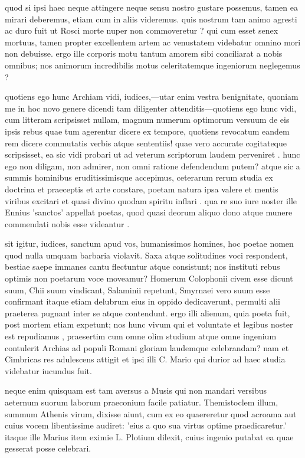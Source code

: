  quod si ipsi haec neque attingere neque sensu nostro gustare possemus, tamen ea mirari deberemus, etiam cum in aliis videremus. quis nostrum tam animo agresti ac duro fuit ut Rosci morte nuper non commoveretur ? qui cum esset senex mortuus, tamen propter excellentem artem ac venustatem videbatur omnino mori non debuisse. ergo ille corporis motu tantum amorem sibi conciliarat a nobis omnibus; nos animorum incredibilis motus celeritatemque ingeniorum neglegemus ?

 quotiens ego hunc Archiam vidi, iudices,—utar enim vestra benignitate, quoniam me in hoc novo genere dicendi tam diligenter attenditis—quotiens ego hunc vidi, cum litteram scripsisset nullam, magnum numerum optimorum versuum de eis ipsis rebus quae tum agerentur dicere ex tempore, quotiens revocatum eandem rem dicere commutatis verbis atque sententiis! quae vero accurate cogitateque scripsisset, ea sic vidi probari ut ad veterum scriptorum laudem perveniret . hunc ego non diligam, non admirer, non omni ratione defendendum putem? atque sic a summis hominibus eruditissimisque accepimus, ceterarum rerum studia ex doctrina et praeceptis et arte constare, poetam natura ipsa valere et mentis viribus excitari et quasi divino quodam spiritu inflari . qua re suo iure noster ille Ennius 'sanctos' appellat poetas, quod quasi deorum aliquo dono atque munere commendati nobis esse videantur .

 sit igitur, iudices, sanctum apud vos, humanissimos homines, hoc poetae nomen quod nulla umquam barbaria violavit. Saxa atque solitudines voci respondent, bestiae saepe immanes cantu flectuntur atque consistunt; nos instituti rebus optimis non poetarum voce moveamur? Homerum Colophonii civem esse dicunt suum, Chii suum vindicant, Salaminii repetunt, Smyrnaei vero suum esse confirmant itaque etiam delubrum eius in oppido dedicaverunt, permulti alii praeterea pugnant inter se atque contendunt. ergo illi alienum, quia poeta fuit, post mortem etiam expetunt; nos hunc vivum qui et voluntate et legibus noster est repudiamus , praesertim cum omne olim studium atque omne ingenium contulerit Archias ad populi Romani gloriam laudemque celebrandam? nam et Cimbricas res adulescens attigit et ipsi illi C. Mario qui durior ad haec studia videbatur iucundus fuit.

 neque enim quisquam est tam aversus a Musis qui non mandari versibus aeternum suorum laborum praeconium facile patiatur. Themistoclem illum, summum Athenis virum, dixisse aiunt, cum ex eo quaereretur quod acroama aut cuius vocem libentissime audiret: 'eius a quo sua virtus optime praedicaretur.' itaque ille Marius item eximie L. Plotium dilexit, cuius ingenio putabat ea quae gesserat posse celebrari.

